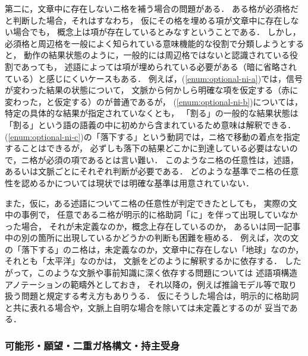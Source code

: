 \documentclass[japanese]{jnlp_1.4}
\begin{document}
第二に，文章中に存在しないニ格を補う場合の問題がある．
ある格が必須格だと判断した場合，それはすなわち，
仮にその格を埋める項が文章中に存在しない場合でも，
概念上は項が存在しているとみなすということである．
しかし，必須格と周辺格を一般によく知られている意味機能的な役割で分類しようとすると，
動作の結果状態のように，一般的には周辺格ではないと認識されている役割であっても，
述語によっては項が埋められている必要がある（暗に省略されている）と感じにくいケースもある．
例えば，(\ref{enum:optional-ni-a})では，信号が変わった結果の状態について，
文脈から何かしら明確な項を仮定する（赤に変わった，と仮定する）のが普通であるが，
(\ref{enum:optional-ni-b})については，特定の具体的な結果が指定されていなくとも，
「割る」の一般的な結果状態は「割る」という語の語義の中に初めから含まれているため意味は解釈できる．
(\ref{enum:optional-ni-c})の「落下する」という動詞では，ニ格で移動の着点を指定することはできるが，
必ずしも落下の結果どこかに到達している必要はないので，ニ格が必須の項であるとは言い難い．
このようなニ格の任意性は，述語，あるいは文脈ごとにそれぞれ判断が必要である．
どのような基準でニ格の任意性を認めるかについては現状では明確な基準は用意されていない．

また，仮に，ある述語についてニ格の任意性が判定できたとしても，
実際の文中の事例で，
任意であるニ格が明示的に格助詞「に」を伴って出現していなかった場合，
それが未定義なのか，概念上存在しているのか，
あるいは同一記事中の別の箇所に出現しているかどうかの判断も困難を極める．
例えば，次の文
の「落下する」のニ格は，未定義なのか，文章中に存在しない「地球」なのか，それとも「太平洋」なのかは，
文脈をどのように解釈するかに依存する．
したがって，このような文脈や事前知識に深く依存する問題については
述語項構造アノテーションの範疇外としておき，
それ以降の，例えば推論モデル等で取り扱う問題と規定する考え方もありうる．
仮にそうした場合は，明示的に格助詞と共に表れる場合や，文脈上自明な場合を除いては未定義とするのが
妥当である．


\subsubsection{可能形・願望・二重ガ格構文・持主受身}
\label{sec:potential}
\end{document}
